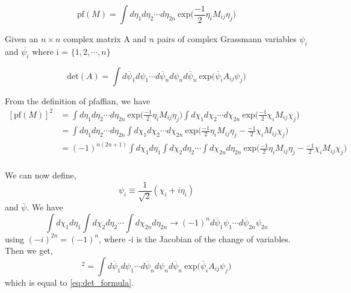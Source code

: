 \begin{equation}
\text{pf}(M) =  \int  d\eta_{1} d\eta_{2} \cdots d\eta_{2n} ~ \text{exp} \Bigg( \frac{-1}{2}\eta_{i} M_{ij} \eta_{j}\Bigg)
\end{equation}


Given an $ n \times n$ complex matrix A and $n$ pairs of complex Grassmann variables $\psi_{i}$ and $\overline{\psi_i}$ 
where i = $\{1, 2, \cdots, n\}$ 

\begin{equation}
\label{eq:det_formula}
\text{det}(A) =  \int  d\overline{\psi}_{1} d\psi_{1} \cdots d\overline{\psi}_{n} d\psi_{n} d\overline{\psi}_{n} ~ \text{exp}  \Big( \overline{\psi}_{i} A_{ij} \psi_{j}\Big)
\end{equation}

From the definition of pfaffian, we have
\begin{align}
\label{pfaffian0}
[\text{pf}(M)]^{2}&=  \int  d\eta_{1} d\eta_{2} \cdots d\eta_{2n} ~ \text{exp} \Big( \frac{-1}{2}\eta_{i} M_{ij} \eta_{j}\Big) \int  d\chi_{1} d\chi_{2} \cdots d\chi_{2n} ~ \text{exp} \Big( \frac{-1}{2}\chi_{i} M_{ij} \chi_{j}\Big)\\
                         &= \int  d\eta_{1} d\eta_{2} \cdots d\eta_{2n}  \int  d\chi_{1} d\chi_{2} \cdots d\chi_{2n} ~ \text{exp} \Big( \frac{-1}{2}\eta_{i} M_{ij} \eta_{j} -  \frac{-1}{2}\chi_{i} M_{ij} \chi_{j}\Big)\\
                         &=(-1)^{n(2n+1)} \int d\chi_{1} d\eta_{1}\int d\chi_{2} d\eta_{2} \cdots \int d\chi_{2n} d\eta_{2n} ~ \text{exp} \Big( \frac{-1}{2}\eta_{i} M_{ij} \eta_{j} -  \frac{-1}{2}\chi_{i} M_{ij} \chi_{j}\Big) \\
\end{align}

We can now define, 
\begin{equation}
\psi_{i} \equiv \frac{1}{\sqrt{2}} (\chi_{i} + i \eta_{i})
\end{equation}
and $\overline{\psi}$. We have 
\[ \int d\chi_{1} d\eta_{1}\int d\chi_{2} d\eta_{2} \cdots \int d\chi_{2n} d\eta_{2n}  \to (-1)^{n} d\overline{\psi}_{1}\psi_{1} \cdots d\overline{\psi}_{2n}\psi_{2n} \]
using $ (-i)^{2n} = (-1)^n$, where -i is the Jacobian of the change of variables. Then we get, 
\begin{equation}
[\text{pf}(M)]^{2} =  \int  d\overline{\psi}_{1} d\psi_{1} \cdots d\overline{\psi}_{n} d\psi_{n} d\overline{\psi}_{n} ~ \text{exp}  \Big( \overline{\psi}_{i} A_{ij} \psi_{j}\Big)
\end{equation}
which is equal to \ref{eq:det_formula}. 


















